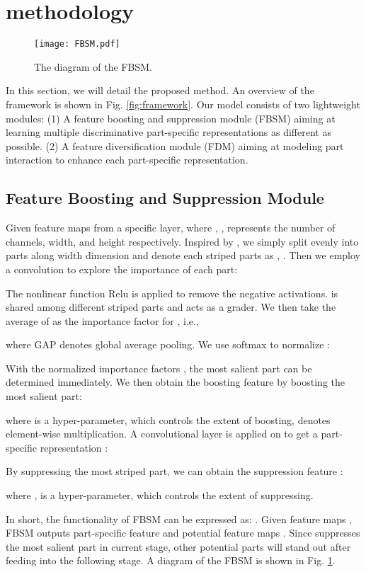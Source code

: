 \documentclass[conference]{IEEEtran}
\begin{document}
	\section{methodology}
	\begin{figure}
		\texttt{[image: FBSM.pdf]}
		\caption{The diagram of the FBSM.}
		\label{fig:FBSM}
	\end{figure}
	In this section, we will detail the proposed method. An overview of the framework is shown in Fig. \ref{fig:framework}. Our model consists of two lightweight modules: (1) A feature boosting and suppression module (FBSM) aiming at 
	learning multiple discriminative part-specific representations as different as possible. 
	(2) A feature diversification module (FDM) aiming at modeling part interaction to enhance each part-specific representation.
	\subsection{Feature Boosting and Suppression Module}
	Given feature maps  from a specific layer, where , ,  represents the number of channels, width, and height respectively. 
	Inspired by \cite{Part-Pool}, we simply split  evenly into  parts along width dimension and 
	denote each striped parts as , . Then we employ a  convolution  to explore the importance of each part:
	
	The nonlinear function Relu\cite{Relu} is applied to remove the negative activations.
	 is shared among different striped parts and acts as a grader. We then take the average of  as the importance factor  for , i.e.,
	
	where GAP denotes global average pooling. We use softmax to normalize :
	
	With the normalized importance factors , the most salient part can be determined immediately. We then obtain the boosting feature  by boosting the most salient part:
	
	where  is a hyper-parameter, which controls the extent of boosting,  denotes element-wise multiplication.
	A convolutional layer  is applied on  to get a part-specific representation :
	
	By suppressing the most striped part, we can obtain the suppression feature :
	
	
	where ,  is a hyper-parameter, which controls the extent of suppressing.
	
	In short, the functionality of FBSM can be expressed as: . Given feature maps , FBSM outputs part-specific feature  and potential feature maps . Since  suppresses the most salient part in current stage, other potential parts will stand out after feeding  into the following stage.
	A diagram of the FBSM is shown in Fig. \ref{fig:FBSM}.
	
\end{document}
